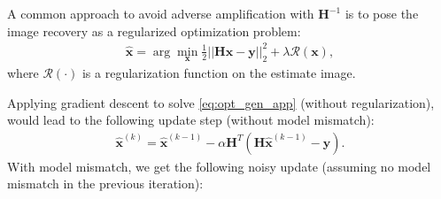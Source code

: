 \noindent A common approach to avoid adverse amplification with $\bm{H}^{-1}$ is to pose the image recovery as a regularized optimization problem:
\begin{align}
\label{eq:opt_gen_app}
   \bm{\hat{x}} = \arg \min_{\bm{x}} \frac{1}{2} ||\bm{H}\bm{x} - \bm{y}||_2^2 + \lambda \mathcal{R}(\bm{x}),
\end{align}
where $\mathcal{R}(\cdot)$ is a regularization function on the estimate image.

Applying gradient descent to solve \cref{eq:opt_gen_app}  (without regularization),
would lead to the following update step (without model mismatch):
\begin{align}
    \label{eq:gradient_step}
    \bm{\hat{x}}^{(k)} = \bm{\hat{x}}^{(k-1)} - \alpha \bm{H}^T(\bm{H}\bm{\hat{x}}^{(k-1)} - \bm{y}).
\end{align}
With model mismatch, we get the following noisy update (assuming no model mismatch in the previous iteration):
